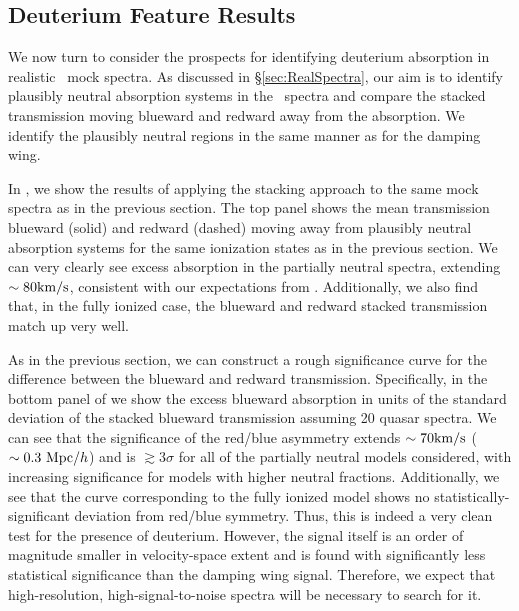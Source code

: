 \subsection{Deuterium Feature Results} \label{sec:DeuteriumResults}


We now turn to consider the prospects for identifying deuterium absorption in realistic \lyb\ mock spectra. As discussed in \S \ref{sec:RealSpectra}, our aim is to identify plausibly neutral absorption systems in the \lyb\ spectra and compare the stacked transmission moving blueward and redward away from the absorption. We identify the plausibly neutral regions in the same manner as for the damping wing.

In , we show the results of applying the stacking approach to the same mock spectra as in the previous section. The top panel shows the mean transmission blueward (solid) and redward (dashed) moving away from plausibly neutral absorption systems for the same ionization states as in the previous section. We can very clearly see excess absorption in the partially neutral spectra, extending $\sim 80\text{km}/\text{s}$, consistent with our expectations from . Additionally, we also find that, in the fully ionized case, the blueward and redward stacked transmission match up very well. 


As in the previous section, we can construct a rough significance curve for the difference between the blueward and redward transmission. Specifically, in the bottom panel of  we show the excess blueward absorption in units of the standard deviation of the stacked blueward transmission assuming 20 quasar spectra. We can see that the significance of the red/blue asymmetry extends $\sim 70\text{km}/\text{s}$ ($\sim 0.3 \ \text{Mpc/$h$}$) and is $\gtrsim 3\sigma$ for all of the partially neutral models considered, with increasing significance for models with higher neutral fractions. Additionally, we see that the curve corresponding to the fully ionized model shows no statistically-significant deviation from red/blue symmetry. Thus, this is indeed a very clean test for the presence of deuterium. However, the signal itself is an order of magnitude smaller in velocity-space extent and is found with significantly less statistical significance than the damping wing signal. Therefore, we expect that high-resolution, high-signal-to-noise spectra will be necessary to search for it. 


